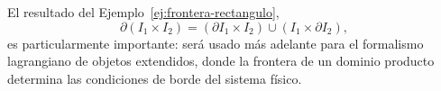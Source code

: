 \begin{observacion}
El resultado del Ejemplo~\ref{ej:frontera-rectangulo},
\[
\partial(I_1\times I_2) = (\partial I_1\times I_2) \cup (I_1\times
\partial I_2),
\]
es particularmente importante: será usado más adelante para el formalismo
lagrangiano de objetos extendidos, donde la frontera de un dominio producto
determina las condiciones de borde del sistema físico.
\end{observacion}
